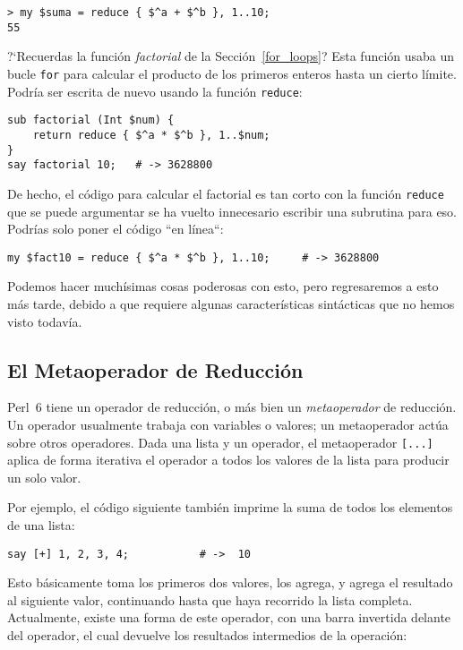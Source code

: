 \begin{lstlisting}
> my $suma = reduce { $^a + $^b }, 1..10;
55
\end{lstlisting}

?`Recuerdas la función \emph{factorial} de la Sección~\ref{for_loops}?
Esta función usaba un bucle {\tt for} para calcular el producto de los
primeros enteros hasta un cierto límite. Podría ser escrita de nuevo 
usando la función {\tt reduce}:

\begin{lstlisting}
sub factorial (Int $num) { 
    return reduce { $^a * $^b }, 1..$num;
}
say factorial 10;   # -> 3628800
\end{lstlisting}
%
De hecho, el código para calcular el factorial es tan corto
con la función {\tt reduce} que se puede argumentar se ha vuelto
innecesario escribir una subrutina para eso. Podrías solo
poner el código ``en línea``:

\begin{lstlisting}
my $fact10 = reduce { $^a * $^b }, 1..10;     # -> 3628800
\end{lstlisting}
%

Podemos hacer muchísimas cosas poderosas con esto, pero regresaremos
a esto más tarde, debido a que requiere algunas características 
sintácticas que no hemos visto todavía.

\subsection{El Metaoperador de Reducción}

Perl~6 tiene un operador de reducción, o más bien 
un \emph{metaoperador} de reducción. Un operador usualmente
trabaja con variables o valores; un metaoperador actúa sobre 
otros operadores. Dada una lista y un operador, el metaoperador
\verb|[...]| aplica de forma iterativa el operador 
a todos los valores de la lista para producir un solo
valor.

Por ejemplo, el código siguiente también imprime la suma de todos
los elementos de una lista:

\begin{lstlisting}
say [+] 1, 2, 3, 4;           # ->  10
\end{lstlisting}

Esto básicamente toma los primeros dos valores, los agrega,
y agrega el resultado al siguiente valor, continuando 
hasta que haya recorrido la lista completa. Actualmente,
existe una forma de este operador, con una barra invertida 
delante del operador, el cual devuelve los resultados 
intermedios de la operación:

